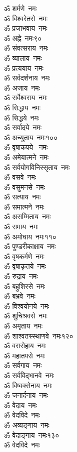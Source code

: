 \begin{multicols}{2}
\begin{flushleft}
ॐ शर्मणे~नमः\\
ॐ विश्वरेतसे~नमः\\
ॐ प्रजाभवाय~नमः\\
ॐ अह्ने~नमः\hfill ९०\\
ॐ संवत्सराय~नमः\\
ॐ व्यालाय~नमः\\
ॐ प्रत्ययाय~नमः\\
ॐ सर्वदर्शनाय~नमः\\
ॐ अजाय~नमः\\
ॐ सर्वेश्वराय~नमः\\
ॐ सिद्धाय~नमः\\
ॐ सिद्धये~नमः\\
ॐ सर्वादये~नमः\\
ॐ अच्युताय~नमः\hfill १००\\
ॐ वृषाकपये ~नमः\\
ॐ अमेयात्मने~नमः\\
ॐ सर्वयोगविनिस्सृताय~नमः\\
ॐ वसवे~नमः\\
ॐ वसुमनसे~नमः\\
ॐ सत्याय~नमः\\
ॐ समात्मने~नमः\\
ॐ असम्मिताय~नमः\\
ॐ समाय~नमः\\
ॐ अमोघाय~नमः\hfill ११०\\
ॐ पुण्डरीकाक्षाय~नमः\\
ॐ वृषकर्मणे~नमः\\
ॐ वृषाकृतये~नमः\\
ॐ रुद्राय~नमः\\
ॐ बहुशिरसे~नमः\\
ॐ बभ्रवे~नमः\\
ॐ विश्वयोनये~नमः\\
ॐ शुचिश्रवसे~नमः\\
ॐ अमृताय~नमः\\
ॐ शाश्वतस्स्थाणवे~नमः\hfill १२०\\
ॐ वरारोहाय~नमः\\
ॐ महातपसे~नमः\\
ॐ सर्वगाय~नमः\\
ॐ सर्वविद्भानवे~नमः\\
ॐ विष्वक्सेनाय~नमः\\
ॐ जनार्दनाय~नमः\\
ॐ वेदाय~नमः\\
ॐ वेदविदे~नमः\\
ॐ अव्यङ्गाय~नमः\\
ॐ वेदाङ्गाय~नमः\hfill १३०\\
ॐ वेदविदे~नमः\\

\end{flushleft}
\end{multicols}
